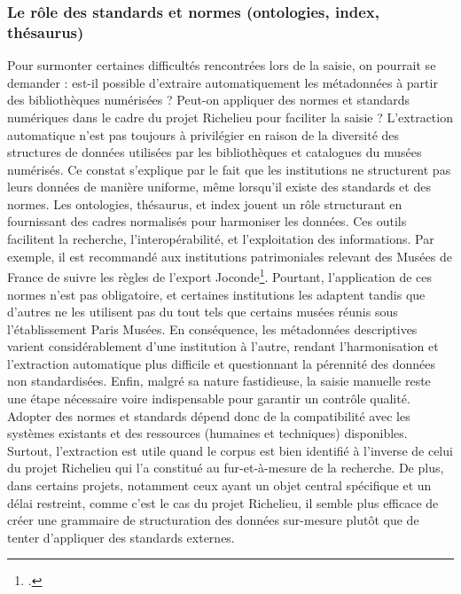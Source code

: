\subsubsection{Le rôle des standards et normes (ontologies, index, thésaurus)}
Pour surmonter certaines difficultés rencontrées lors de la saisie, on pourrait se demander : est-il possible d'extraire automatiquement les métadonnées à partir des bibliothèques numérisées ? Peut-on appliquer des normes et standards numériques dans le cadre du projet Richelieu pour faciliter la saisie ? L'extraction automatique n'est pas toujours à privilégier en raison de la diversité des structures de données utilisées par les bibliothèques et catalogues du musées numérisés. Ce constat s'explique par le fait que les institutions ne structurent pas leurs données de manière uniforme, même lorsqu'il existe des standards et des normes. Les ontologies, thésaurus, et index jouent un rôle structurant en fournissant des cadres normalisés pour harmoniser les données. Ces outils facilitent la recherche, l'interopérabilité, et l'exploitation des informations. Par exemple, il est recommandé aux institutions patrimoniales relevant des Musées de France de suivre les règles de l'export Joconde\footcite{MINISTEREDELACULTUREJoconde2024}. Pourtant, l'application de ces normes n'est pas obligatoire, et certaines institutions les adaptent tandis que d'autres ne les utilisent pas du tout tels que certains musées réunis sous l'établissement Paris Musées. En conséquence, les métadonnées descriptives varient considérablement d'une institution à l'autre, rendant l'harmonisation et l'extraction automatique plus difficile et questionnant la pérennité des données non standardisées. Enfin, malgré sa nature fastidieuse, la saisie manuelle reste une étape nécessaire voire indispensable pour garantir un contrôle qualité. Adopter des normes et standards dépend donc de la compatibilité avec les systèmes existants et des ressources (humaines et techniques) disponibles. Surtout, l'extraction est utile quand le corpus est bien identifié à l'inverse de celui du projet Richelieu qui l'a constitué au fur-et-à-mesure de la recherche. De plus, dans certains projets, notamment ceux ayant un objet central spécifique et un délai restreint, comme c'est le cas du projet Richelieu, il semble plus efficace de créer une grammaire de structuration des données sur-mesure plutôt que de tenter d'appliquer des standards externes. 


